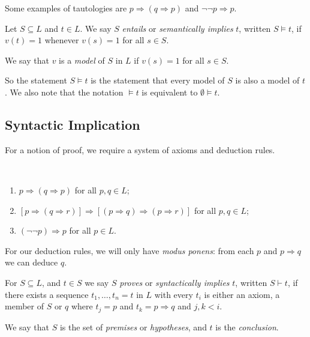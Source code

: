\documentclass[a3paper, 10pt]{article}
\newcommand{\enumpre}{}
\renewcommand{\vocab}[1]{\emph{#1}}
\begin{document}
\begin{multicols*}{5}
Some examples of tautologies are $p \Rightarrow (q \Rightarrow p)$ and $\lnot \lnot p \Rightarrow p$.

\begin{definition}
  Let $S \subseteq L$ and $t \in L$. We say $S$ \vocab{entails} or \vocab{semantically implies} $t$, written $S \models t$, if $v(t) = 1$ whenever $v(s) = 1$ for all $s \in S$.
\end{definition}
\begin{definition}[Model]
  We say that $v$ is a \vocab{model} of $S$ in $L$ if $v(s) = 1$ for all $s \in S$.
\end{definition}

So the statement $S \models t$ is the statement that every model of $S$ is also a model of $t$. We also note that the notation $\models t$ is equivalent to $\emptyset \models t$.

\subsection{Syntactic Implication}

For a notion of proof, we require a system of axioms and deduction rules.

\begin{axiom}~
  \enumpre
  \begin{enumerate}
    \item $p \Rightarrow (q \Rightarrow p)$ for all $p, q \in L$;
    \item $[p \Rightarrow (q \Rightarrow r)] \Rightarrow [(p \Rightarrow q) \Rightarrow (p \Rightarrow r)]$ for all $p, q \in L$;
    \item $(\lnot \lnot p) \Rightarrow p$ for all $p \in L$.
  \end{enumerate}
\end{axiom}

For our deduction rules, we will only have \vocab{modus ponens}: from each $p$ and $p \Rightarrow q$ we can deduce $q$.

\begin{definition}
  For $S \subseteq L$, and $t \in S$ we say $S$ \vocab{proves} or \vocab{syntactically implies} $t$, written $S \vdash t$, if there exists a sequence $t_1, \dots, t_n=t$ in $L$ with every $t_i$ is either an axiom, a member of $S$ or $q$ where $t_j = p$ and $t_k = p \Rightarrow q$ and $j, k < i$.

  We say that $S$ is the set of \vocab{premises} or \vocab{hypotheses}, and $t$ is the \vocab{conclusion}.
\end{definition}


\end{multicols*}
\end{document}
